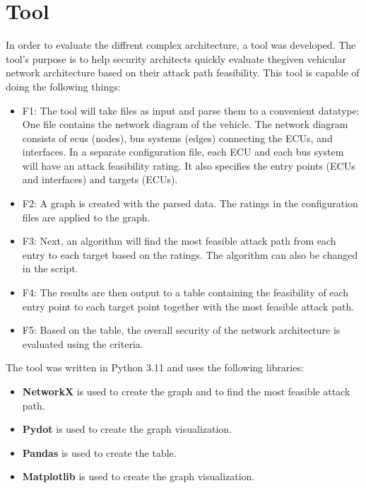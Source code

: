 \chapter{Tool}
\label{chp:tool}

In order to evaluate the diffrent complex architecture, a tool was developed.
The tool's purpose is to help security architects quickly evaluate thegiven vehicular network architecture based on their \gls{attack path} feasibility.
This tool is capable of doing the following things:

\begin{itemize}

    \item F1\label{sec:f1}: The tool will take files as input and parse them to a convenient datatype: 
    One file contains the network diagram of the vehicle.
    The network diagram consists of \gls{ecu}s (nodes), bus systems (edges) connecting the ECUs, and interfaces. 
    In a separate configuration file, each ECU and each bus system will have an attack feasibility rating. 
    It also specifies the entry points (ECUs and interfaces) and targets (ECUs).
    
    \item F2\label{sec:f2}: A graph is created with the parsed data. The ratings in the configuration files are applied to the graph.
    
    \item F3\label{sec:f3}: Next, an algorithm will find the most feasible attack path from each entry to each target based on the ratings. The algorithm can also be changed in the script. 
    
    \item F4\label{sec:f4}: The results are then output to a table containing the feasibility of each entry point to each target point together with the most feasible attack path.
    
    \item F5\label{sec:f5}: Based on the table, the overall security of the network architecture is evaluated using the criteria.
    
    \end{itemize}

The tool was written in Python 3.11 and uses the following libraries:

\begin{itemize}

    \item \textbf{NetworkX} \cite{networkx} is used to create the graph and to find the most feasible attack path.
    
    \item \textbf{Pydot} \cite{pydot} is used to create the graph visualization.
    
    \item \textbf{Pandas} \cite{pandas} is used to create the table.
    
    \item \textbf{Matplotlib} \cite{matplotlib} is used to create the graph visualization.
    
\end{itemize}
